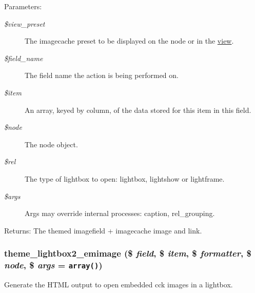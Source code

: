 \begin{Desc}
\item[Parameters:]
\begin{description}
\item[{\em \$view\_\-preset}]The imagecache preset to be displayed on the node or in the \hyperlink{classview}{view}. \item[{\em \$field\_\-name}]The field name the action is being performed on. \item[{\em \$item}]An array, keyed by column, of the data stored for this item in this field. \item[{\em \$node}]The node object. \item[{\em \$rel}]The type of lightbox to open: lightbox, lightshow or lightframe. \item[{\em \$args}]Args may override internal processes: caption, rel\_\-grouping. \end{description}
\end{Desc}
\begin{Desc}
\item[Returns:]The themed imagefield + imagecache image and link. \end{Desc}
\hypertarget{lightbox2_8formatter_8inc_61e32054133c7f64ee7504d0b69b1595}{
\subsubsection[{theme\_\-lightbox2\_\-emimage}]{\setlength{\rightskip}{0pt plus 5cm}theme\_\-lightbox2\_\-emimage (\$ {\em field}, \/  \$ {\em item}, \/  \$ {\em formatter}, \/  \$ {\em node}, \/  \$ {\em args} = {\tt array()})}}
\label{lightbox2_8formatter_8inc_61e32054133c7f64ee7504d0b69b1595}


Generate the HTML output to open embedded cck images in a lightbox.

